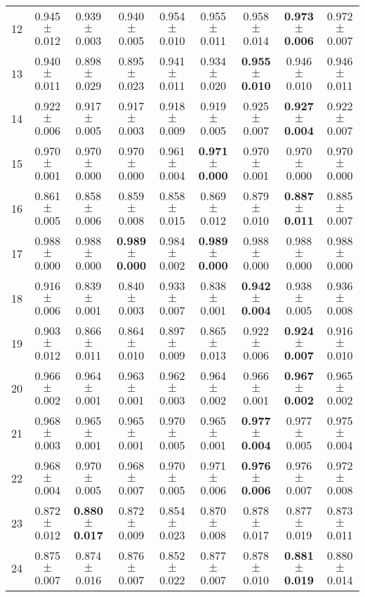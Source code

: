 \begin{table}[!ht]
{\begin{tabular}{r c c c c c c c c}
12 & 0.945 $\pm$ 0.012 & 0.939 $\pm$ 0.003 & 0.940 $\pm$ 0.005 & 0.954 $\pm$ 0.010 & 0.955 $\pm$ 0.011 & 0.958 $\pm$ 0.014 & \textbf{0.973 $\pm$ 0.006} & 0.972 $\pm$ 0.007 \\
13 & 0.940 $\pm$ 0.011 & 0.898 $\pm$ 0.029 & 0.895 $\pm$ 0.023 & 0.941 $\pm$ 0.011 & 0.934 $\pm$ 0.020 & \textbf{0.955 $\pm$ 0.010} & 0.946 $\pm$ 0.010 & 0.946 $\pm$ 0.011 \\
14 & 0.922 $\pm$ 0.006 & 0.917 $\pm$ 0.005 & 0.917 $\pm$ 0.003 & 0.918 $\pm$ 0.009 & 0.919 $\pm$ 0.005 & 0.925 $\pm$ 0.007 & \textbf{0.927 $\pm$ 0.004} & 0.922 $\pm$ 0.007 \\
15 & 0.970 $\pm$ 0.001 & 0.970 $\pm$ 0.000 & 0.970 $\pm$ 0.000 & 0.961 $\pm$ 0.004 & \textbf{0.971 $\pm$ 0.000} & 0.970 $\pm$ 0.001 & 0.970 $\pm$ 0.000 & 0.970 $\pm$ 0.000 \\
16 & 0.861 $\pm$ 0.005 & 0.858 $\pm$ 0.006 & 0.859 $\pm$ 0.008 & 0.858 $\pm$ 0.015 & 0.869 $\pm$ 0.012 & 0.879 $\pm$ 0.010 & \textbf{0.887 $\pm$ 0.011} & 0.885 $\pm$ 0.007 \\
17 & 0.988 $\pm$ 0.000 & 0.988 $\pm$ 0.000 & \textbf{0.989 $\pm$ 0.000} & 0.984 $\pm$ 0.002 & \textbf{0.989 $\pm$ 0.000} & 0.988 $\pm$ 0.000 & 0.988 $\pm$ 0.000 & 0.988 $\pm$ 0.000 \\
18 & 0.916 $\pm$ 0.006 & 0.839 $\pm$ 0.001 & 0.840 $\pm$ 0.003 & 0.933 $\pm$ 0.007 & 0.838 $\pm$ 0.001 & \textbf{0.942 $\pm$ 0.004} & 0.938 $\pm$ 0.005 & 0.936 $\pm$ 0.008 \\
19 & 0.903 $\pm$ 0.012 & 0.866 $\pm$ 0.011 & 0.864 $\pm$ 0.010 & 0.897 $\pm$ 0.009 & 0.865 $\pm$ 0.013 & 0.922 $\pm$ 0.006 & \textbf{0.924 $\pm$ 0.007} & 0.916 $\pm$ 0.010 \\
20 & 0.966 $\pm$ 0.002 & 0.964 $\pm$ 0.001 & 0.963 $\pm$ 0.001 & 0.962 $\pm$ 0.003 & 0.964 $\pm$ 0.002 & 0.966 $\pm$ 0.001 & \textbf{0.967 $\pm$ 0.002} & 0.965 $\pm$ 0.002 \\
21 & 0.968 $\pm$ 0.003 & 0.965 $\pm$ 0.001 & 0.965 $\pm$ 0.001 & 0.970 $\pm$ 0.005 & 0.965 $\pm$ 0.001 & \textbf{0.977 $\pm$ 0.004} & 0.977 $\pm$ 0.005 & 0.975 $\pm$ 0.004 \\
22 & 0.968 $\pm$ 0.004 & 0.970 $\pm$ 0.005 & 0.968 $\pm$ 0.007 & 0.970 $\pm$ 0.005 & 0.971 $\pm$ 0.006 & \textbf{0.976 $\pm$ 0.006} & 0.976 $\pm$ 0.007 & 0.972 $\pm$ 0.008 \\
23 & 0.872 $\pm$ 0.012 & \textbf{0.880 $\pm$ 0.017} & 0.872 $\pm$ 0.009 & 0.854 $\pm$ 0.023 & 0.870 $\pm$ 0.008 & 0.878 $\pm$ 0.017 & 0.877 $\pm$ 0.019 & 0.873 $\pm$ 0.011 \\
24 & 0.875 $\pm$ 0.007 & 0.874 $\pm$ 0.016 & 0.876 $\pm$ 0.007 & 0.852 $\pm$ 0.022 & 0.877 $\pm$ 0.007 & 0.878 $\pm$ 0.010 & \textbf{0.881 $\pm$ 0.019} & 0.880 $\pm$ 0.014 \\

\end{tabular}}
\end{table}
